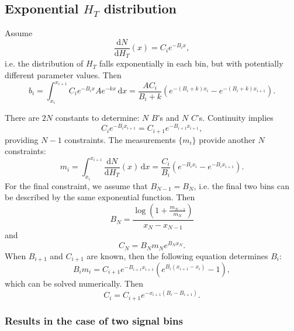 \documentclass[12pt]{article}
\begin{document}
\subsection{Exponential $H_T$ distribution}
\label{sec:expHt}
Assume
\begin{equation}
\frac{\mathrm{d}N}{\mathrm{d}H_T}(x) = C_{i}e^{-B_{i}x}, 
\end{equation}
i.e. the distribution of $H_T$ falls exponentially in each bin, but with potentially different parameter values.
Then
\begin{equation}
b_i = \int_{x_i}^{x_{i+1}}\! C_{i}e^{-B_{i}x} Ae^{-kx}\, \mathrm{d}x = \frac{AC_i}{B_i+k}(e^{-(B_i+k)x_{i}} - e^{-(B_i+k)x_{i+1}}).
\label{eq:biExp}
\end{equation}

There are $2N$ constants to determine: $N$ $B$'s and $N$ $C$'s.
Continuity implies
\begin{equation}
C_{i}e^{-B_{i}x_{i+1}} = C_{i+1}e^{-B_{i+1}x_{i+1}},
\end{equation}
providing $N-1$ constraints.
The measurements $\{m_i\}$ provide another $N$ constraints:
\begin{equation}
m_i = \int_{x_i}^{x_{i+1}}\! \frac{\mathrm{d}N}{\mathrm{d}H_T}(x) \, \mathrm{d}x = \frac{C_i}{B_i}(e^{-B_{i}x_{i}} - e^{-B_{i}x_{i+1}}).
\end{equation}
For the final constraint, we assume that $B_{N-1} = B_N$, i.e. the final two bins can be described by the same exponential function. 
Then 
\begin{equation}
B_N = \frac{\log(1+\frac{m_{N-1}}{m_N})}{x_N - x_{N-1}}
\end{equation}
and
\begin{equation}
C_N = B_{N}m_{N}e^{B_{N}x_{N}}.
\end{equation}
When $B_{i+1}$ and $C_{i+1}$ are known, then the following equation determines $B_i$:
\begin{equation}
B_i m_i = C_{i+1} e^{-B_{i+1}x_{i+1}}(e^{B_i (x_{i+1}-x_i)}-1), 
\end{equation}
which can be solved numerically.  Then
\begin{equation}
C_i = C_{i+1} e^{-x_{i+1}(B_i-B_{i+1})}.
\end{equation}

\subsubsection{Results in the case of two signal bins}
\end{document}
